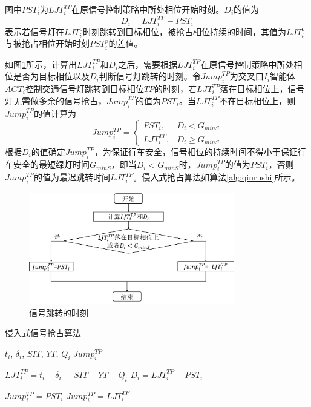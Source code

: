 图中${PST_i}$为${{LJT}_i^{TP}}$在原信号控制策略中所处相位开始时刻。${D_i}$的值为
\begin{equation}
	\label{equation:D_i}
	D_i={LJT}_i^{TP}-PST_i
\end{equation}
表示若信号灯在${{LJT}_i^o}$时刻跳转到目标相位，被抢占相位持续的时间，其值为${{LJT}_i^o}$与被抢占相位开始时刻${{PST}_i^p}$的差值。

如图\ref{fig:jump_time}所示，计算出${{LJT}_i^{TP}}$和${D_i}$之后，需要根据${{LJT}_i^{TP}}$在原信号控制策略中所处相位是否为目标相位以及${D_i}$判断信号灯跳转的时刻。令${{Jump}_i^{TP}}$为交叉口${I_i}$智能体${AGT_i}$控制交通信号灯跳转到目标相位${TP}$的时刻，若${{LJT}_i^{TP}}$落在目标相位上，信号灯无需做多余的信号抢占，${{Jump}_i^{TP}}$的值为${PST_i}$。当${{LJT}_i^{TP}}$不在目标相位上，则${{Jump}_i^{TP}}$的值计算为
\begin{equation}
	Jump_{i}^{TP}=
	\begin{cases}
		PST_{i}, & D_{i}<G_{minS} \\
		LJT_{i}^{TP}, & D_{i}\geqslant G_{minS}
	\end{cases}
	\label{equation:jump}
\end{equation}
根据${D_i}$的值确定${{Jump}_i^{TP}}$，为保证行车安全，信号相位的持续时间不得小于保证行车安全的最短绿灯时间${G_{minS}}$，即当${D_i<G_{minS}}$时，${{Jump}_i^{TP}}$的值为${PST_i}$，否则${{Jump}_i^{TP}}$的值为最迟跳转时间${{LJT}_i^{TP}}$。侵入式抢占算法如算法\ref{alg:qinrushi}所示。

\begin{figure}[ht]
	\centering
	\includegraphics[width=0.8\textwidth]{figures/jump_time.png}
	\caption{信号跳转的时刻}
	\label{fig:jump_time}
\end{figure}

\begin{algorithm}[!ht]
	\renewcommand{\algorithmicrequire}{\textbf{Input:}}
	\renewcommand{\algorithmicensure}{\textbf{Output:}}
	\caption{侵入式信号抢占算法}
	\label{alg:qinrushi}
	\begin{algorithmic}[1]
		\REQUIRE ${t_i}$, ${\delta_i}$, ${SIT}$, ${YT}$, ${Q_i}$  %
		\ENSURE ${Jump_i^{TP}}$ %
		
		\STATE ${{LJT}_i^{TP}=t_i-\delta_i\ -SIT-YT-Q_i}$
		\STATE ${D_i={LJT}_i^{TP}-PST_i}$
		
		\STATE ${Jump_i^{TP} = PST_i}$
		\ELSE
		\STATE  ${Jump_i^{TP} = LJT_i^{TP}}$
		\ENDIF
		
	\end{algorithmic}
\end{algorithm}


